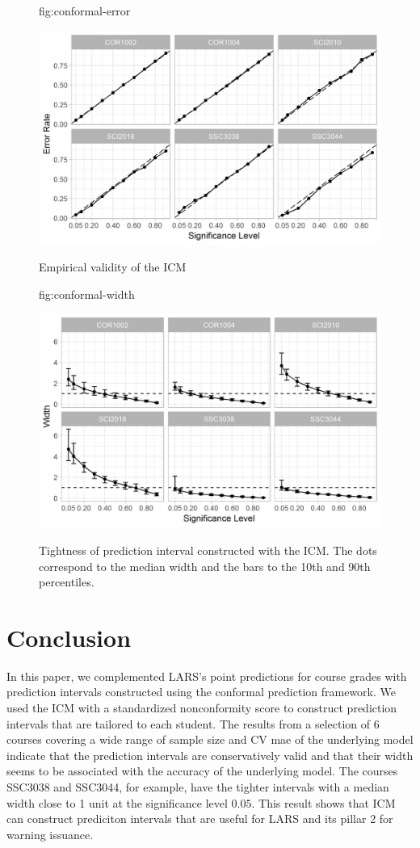 \documentclass[pmlr]{jmlr}%
\begin{document}
\begin{figure}[htbp]
	\floatconts
	{fig:conformal-error}
	{\caption{Empirical validity of the ICM}}
	{\includegraphics[width=0.8\linewidth]{figures/conformal-error}}
\end{figure}

\begin{figure}[htbp]
	\floatconts
	{fig:conformal-width}
	{\caption{Tightness of prediction interval constructed with the ICM. The dots correspond to the median width and the bars to the 10th and 90th percentiles.}}
	{\includegraphics[width=0.8\linewidth]{figures/conformal-width}}
\end{figure}

\section{Conclusion}
\label{sec:conclusion}


In this paper, we complemented LARS's point predictions for course grades with prediction intervals constructed using the conformal prediction framework. We used the ICM with a standardized nonconformity score to construct prediction intervals that are tailored to each student. The results from a selection of 6 courses covering a wide range of sample size and CV mae of the underlying model indicate that the prediction intervals are conservatively valid and that their width seems to be associated with the accuracy of the underlying model. The courses SSC3038 and SSC3044, for example, have the tighter intervals with a median width close to 1 unit at the significance level $0.05$. This result shows that ICM can construct prediciton intervals that are useful for LARS and its pillar 2 for warning issuance.
\end{document}
